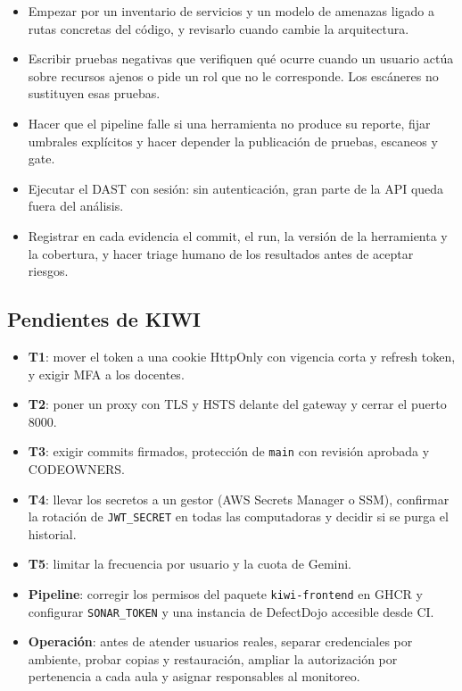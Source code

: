 \documentclass[12pt,a4paper]{article}
\begin{document}
\begin{itemize}[leftmargin=*]
  \item Empezar por un inventario de servicios y un modelo de amenazas ligado a rutas concretas
  del código, y revisarlo cuando cambie la arquitectura.
  \item Escribir pruebas negativas que verifiquen qué ocurre cuando un usuario actúa sobre recursos
  ajenos o pide un rol que no le corresponde. Los escáneres no sustituyen esas pruebas.
  \item Hacer que el pipeline falle si una herramienta no produce su reporte, fijar umbrales
  explícitos y hacer depender la publicación de pruebas, escaneos y gate.
  \item Ejecutar el DAST con sesión: sin autenticación, gran parte de la API queda fuera del
  análisis.
  \item Registrar en cada evidencia el commit, el run, la versión de la herramienta y la cobertura,
  y hacer triage humano de los resultados antes de aceptar riesgos.
\end{itemize}

\subsection{Pendientes de KIWI}

\begin{itemize}[leftmargin=*]
  \item \textbf{T1}: mover el token a una cookie HttpOnly con vigencia corta y refresh token, y
  exigir MFA a los docentes.
  \item \textbf{T2}: poner un proxy con TLS y HSTS delante del gateway y cerrar el puerto 8000.
  \item \textbf{T3}: exigir commits firmados, protección de \texttt{main} con revisión aprobada y
  CODEOWNERS.
  \item \textbf{T4}: llevar los secretos a un gestor (AWS Secrets Manager o SSM), confirmar la
  rotación de \texttt{JWT\_SECRET} en todas las computadoras y decidir si se purga el historial.
  \item \textbf{T5}: limitar la frecuencia por usuario y la cuota de Gemini.
  \item \textbf{Pipeline}: corregir los permisos del paquete \texttt{kiwi-frontend} en GHCR y
  configurar \texttt{SONAR\_TOKEN} y una instancia de DefectDojo accesible desde CI.
  \item \textbf{Operación}: antes de atender usuarios reales, separar credenciales por ambiente,
  probar copias y restauración, ampliar la autorización por pertenencia a cada aula y asignar
  responsables al monitoreo.
\end{itemize}
\end{document}

